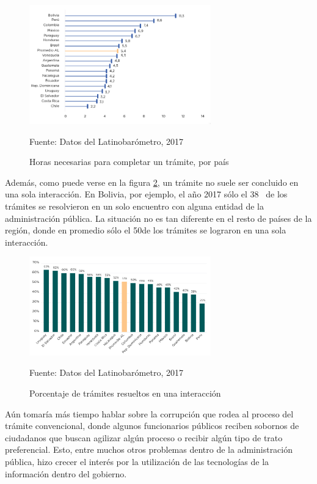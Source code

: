 \begin{figure}[htbp]
    \centering
    \includegraphics[width=0.7\textwidth]{assets/horastramite}
    \caption{Horas necesarias para completar un trámite, por país}{Fuente: Datos del Latinobarómetro, 2017}
    \label{fig:horastramite}
\end{figure}

Además, como puede verse en la figura \ref{fig:tramites_una_interaccion}, un trámite no suele ser concluido en una sola interacción. 
En Bolivia, por ejemplo, el año 2017 sólo el 38\percentsign ~ de los trámites se resolvieron en un solo encuentro con alguna entidad de la administración pública. 
La situación no es tan diferente en el resto de países de la región, donde en promedio sólo el 50\percentsign de los trámites se lograron en una sola interacción.

\begin{figure}
    \centering
    \includegraphics[width=0.7\textwidth]{assets/tramites_una_interaccion}
    \caption{Porcentaje de trámites resueltos en una interacción}{Fuente: Datos del Latinobarómetro, 2017}
    \label{fig:tramites_una_interaccion}
\end{figure}

Aún tomaría más tiempo hablar sobre la corrupción que rodea al proceso del trámite convencional, 
donde algunos funcionarios públicos reciben sobornos de ciudadanos que buscan agilizar algún proceso o recibir algún tipo de trato preferencial.
Esto, entre muchos otros problemas dentro de la administración pública, hizo crecer el interés por la utilización de las tecnologías de la información dentro del gobierno.

